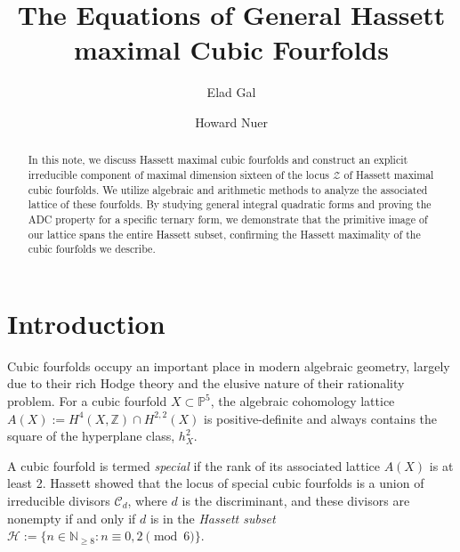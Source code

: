 \documentclass[11pt,letterpaper]{amsart} %
\theoremstyle{definition}
\begin{document}
\title{The Equations of General Hassett maximal Cubic Fourfolds} 

\author{Elad Gal}
\address{Faculty of Mathematics \\ Technion, Israel Institute of Technology} 

\author{Howard Nuer}
\address{Faculty of Mathematics \\ Technion, Israel Institute of Technology}

\begin{abstract}
In this note, we discuss Hassett maximal cubic fourfolds and construct an explicit irreducible component of maximal dimension sixteen of the locus $\mathcal{Z}$ of Hassett maximal cubic fourfolds.
We utilize algebraic and arithmetic methods to analyze the associated lattice of these fourfolds. %
By studying general integral quadratic forms and proving the ADC property for a specific ternary form, we demonstrate that the primitive image of our lattice spans the entire Hassett subset, confirming the Hassett maximality of the cubic fourfolds we describe.
\end{abstract}

\maketitle

\section{Introduction}

Cubic fourfolds occupy an important place in modern algebraic geometry, largely due to their rich Hodge theory and the elusive nature of their rationality problem. %
For a cubic fourfold $X \subset \mathbb{P}^5$, the algebraic cohomology lattice $A(X) := H^4(X, \mathbb{Z}) \cap H^{2,2}(X)$ is positive-definite and always contains the square of the hyperplane class, $h_X^2$. %

A cubic fourfold is termed \emph{special} if the rank of its associated lattice $A(X)$ is at least 2. %
Hassett \cite{Hassett} showed that the locus of special cubic fourfolds is a union of irreducible divisors $\mathcal{C}_d$, where $d$ is the discriminant, and these divisors are nonempty if and only if $d$ is in the \emph{Hassett subset} $\mathcal{H} := \{n \in \mathbb{N}_{\ge 8} : n \equiv 0, 2 \pmod 6\}$. %
\end{document}
